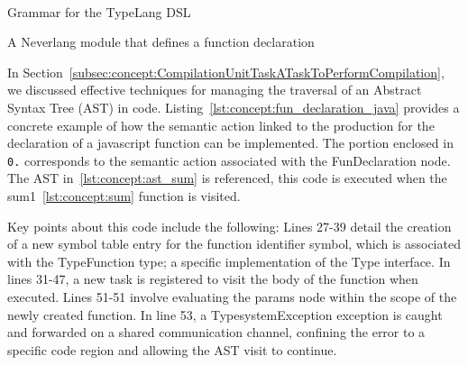 \begin{Listing}
\begin{bnf*}
    {\bnfts{\$} }\\
    {\bnfts{\#} }\\
    {\bnfts{[0-9]}}\\
    {}\\
    {}\\
    {}\\
    {}
\end{bnf*}
  \caption{Grammar for the TypeLang DSL}
  \label{lst:concept:typelang_grammar}
\end{Listing}

\begin{Listing}
    \centering
    \caption{A Neverlang module that defines a function declaration}
    \label{lst:concept:fun_declaration_java}
\end{Listing}


In Section~\ref{subsec:concept:CompilationUnitTaskATaskToPerformCompilation}, we discussed effective techniques for managing the traversal of an Abstract Syntax Tree (AST) in code. Listing~\ref{lst:concept:fun_declaration_java} provides a concrete example of how the semantic action linked to the production for the declaration of a javascript function can be implemented. The portion enclosed in \texttt{0.{}} corresponds to the semantic action associated with the FunDeclaration node. The AST in~\ref{lst:concept:ast_sum} is referenced, this code is executed when the sum1~\ref{lst:concept:sum} function is visited.

Key points about this code include the following: Lines 27-39 detail the creation of a new symbol table entry for the function identifier symbol, which is associated with the TypeFunction type; a specific implementation of the Type interface. In lines 31-47, a new task is registered to visit the body of the function when executed. Lines 51-51 involve evaluating the params node within the scope of the newly created function. In line 53, a TypesystemException exception is caught and forwarded on a shared communication channel, confining the error to a specific code region and allowing the AST visit to continue.


